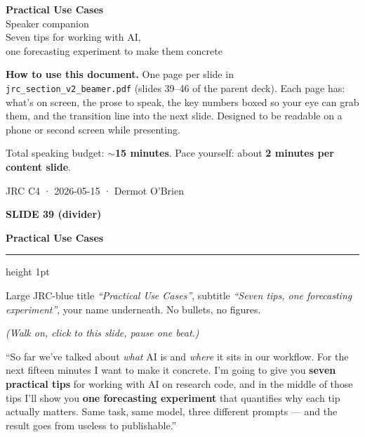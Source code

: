 \documentclass[11pt,a4paper]{article}
\newcommand{\slidehead}[2]{%
  \vspace{2pt}%
  {\small\color{mutedgrey}\textbf{SLIDE #1}}\par
  {\LARGE\color{jrcblue}\bfseries #2}\par
  \vspace{6pt}%
  {\color{jrcblue}\hrule height 1pt}%
  \vspace{8pt}%
}
\newcommand{\block}[1]{\par\vspace{4pt}{\small\color{jrcblue}\textbf{\MakeUppercase{#1}}}\par\vspace{2pt}}
\newenvironment{sayblock}{%
  \begin{tcolorbox}[colback=cardbg, colframe=jrcblue, boxrule=0.8pt, arc=2pt,
                    left=10pt, right=10pt, top=6pt, bottom=6pt, fontupper=\normalsize,
                    title={\bfseries Say this}, coltitle=white, colbacktitle=jrcblue,
                    fonttitle=\small\bfseries]
}{%
  \end{tcolorbox}
}
\begin{document}
\thispagestyle{empty}
\vspace*{30mm}
\begin{center}
  {\Huge\color{jrcblue}\bfseries Practical Use Cases}\\[8pt]
  {\Large\color{mutedgrey}Speaker companion}\\[24pt]
  {\large Seven tips for working with AI,\\ one forecasting experiment to make them concrete}\\[36pt]
  \begin{tcolorbox}[colback=jrcblue!6, colframe=jrcblue, boxrule=0.8pt, arc=3pt,
                    width=0.75\textwidth, left=14pt, right=14pt, top=10pt, bottom=10pt]
    \small
    \textbf{How to use this document.}
    One page per slide in \texttt{jrc\_section\_v2\_beamer.pdf} (slides 39–46
    of the parent deck). Each page has: what's on screen, the prose to speak,
    the key numbers boxed so your eye can grab them, and the transition line
    into the next slide. Designed to be readable on a phone or second screen
    while presenting.\par\vspace{4pt}
    Total speaking budget: \textbf{$\sim$15 minutes}. Pace yourself: about
    \textbf{2 minutes per content slide}.
  \end{tcolorbox}
  \vfill
  {\small\color{gray}JRC C4 · 2026-05-15 · Dermot O'Brien}
\end{center}
\newpage

\slidehead{39 (divider)}{Practical Use Cases}

\block{On screen}
Large JRC-blue title \textit{``Practical Use Cases''}, subtitle \textit{``Seven
tips, one forecasting experiment''}, your name underneath. No bullets, no
figures.

\begin{sayblock}
\textit{(Walk on, click to this slide, pause one beat.)}\par\vspace{4pt}
``So far we've talked about \emph{what} AI is and \emph{where} it sits in our
workflow. For the next fifteen minutes I want to make it concrete. I'm going to
give you \textbf{seven practical tips} for working with AI on research code,
and in the middle of those tips I'll show you \textbf{one forecasting
experiment} that quantifies why each tip actually matters. Same task, same
model, three different prompts — and the result goes from useless to
publishable.''
\end{sayblock}
\end{document}

